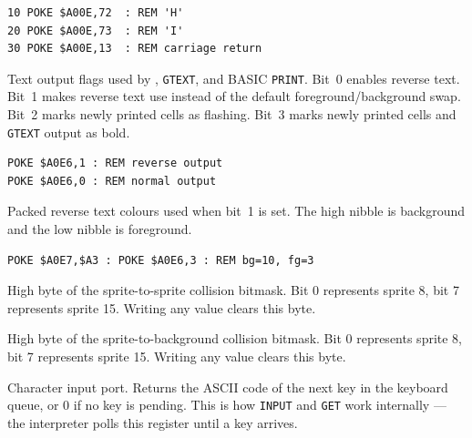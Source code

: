 \begin{lstlisting}
10 POKE $A00E,72  : REM 'H'
20 POKE $A00E,73  : REM 'I'
30 POKE $A00E,13  : REM carriage return
\end{lstlisting}



Text output flags used by , \texttt{GTEXT}, and BASIC
\texttt{PRINT}. Bit~0 enables reverse text. Bit~1 makes reverse text use
 instead of the default foreground/background swap. Bit~2 marks
newly printed cells as flashing. Bit~3 marks newly printed cells and
\texttt{GTEXT} output as bold.

\begin{lstlisting}
POKE $A0E6,1 : REM reverse output
POKE $A0E6,0 : REM normal output
\end{lstlisting}



Packed reverse text colours used when  bit~1 is set. The high
nibble is background and the low nibble is foreground.

\begin{lstlisting}
POKE $A0E7,$A3 : POKE $A0E6,3 : REM bg=10, fg=3
\end{lstlisting}



High byte of the sprite-to-sprite collision bitmask.  Bit 0 represents sprite
8, bit 7 represents sprite 15.  Writing any value clears this byte.



High byte of the sprite-to-background collision bitmask.  Bit 0 represents
sprite 8, bit 7 represents sprite 15.  Writing any value clears this byte.



Character input port.  Returns the ASCII code of the next key in the keyboard
queue, or 0 if no key is pending.  This is how \texttt{INPUT} and \texttt{GET}
work internally --- the interpreter polls this register until a key arrives.

